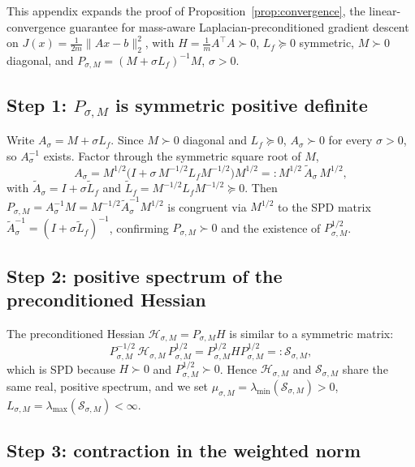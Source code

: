 \documentclass[12pt,a4paper]{article}
\theoremstyle{plain}
\theoremstyle{definition}
\theoremstyle{remark}
\newcommand{\1}{\mathbf{1}}
\begin{document}
This appendix expands the proof of Proposition~\ref{prop:convergence},
the linear-convergence guarantee for mass-aware
Laplacian-preconditioned gradient descent on
$J(x) = \frac{1}{2m}\|A x - b\|_2^2$, with
$H = \tfrac{1}{m} A^\top A \succ 0$, $L_f \succeq 0$ symmetric,
$M \succ 0$ diagonal, and
$P_{\sigma,M} = (M + \sigma L_f)^{-1} M$, $\sigma > 0$.

\subsection{Step 1: $P_{\sigma,M}$ is symmetric positive definite}

Write $A_\sigma = M + \sigma L_f$. Since $M \succ 0$ diagonal and
$L_f \succeq 0$, $A_\sigma \succ 0$ for every $\sigma > 0$, so
$A_\sigma^{-1}$ exists. Factor through the symmetric square root of $M$,
\[
    A_\sigma
    = M^{1/2}\bigl(I + \sigma\, M^{-1/2} L_f M^{-1/2}\bigr) M^{1/2}
    =: M^{1/2}\,\widetilde A_\sigma\, M^{1/2},
\]
with $\widetilde A_\sigma = I + \sigma \widetilde L_f$ and
$\widetilde L_f = M^{-1/2} L_f M^{-1/2} \succeq 0$. Then
$P_{\sigma,M} = A_\sigma^{-1} M = M^{-1/2} \widetilde A_\sigma^{-1} M^{1/2}$
is congruent via $M^{1/2}$ to the SPD matrix
$\widetilde A_\sigma^{-1} = (I + \sigma \widetilde L_f)^{-1}$, confirming
$P_{\sigma,M} \succ 0$ and the existence of $P_{\sigma,M}^{1/2}$.

\subsection{Step 2: positive spectrum of the preconditioned Hessian}

The preconditioned Hessian $\mathcal{H}_{\sigma,M} = P_{\sigma,M} H$ is
similar to a symmetric matrix:
\[
    P_{\sigma,M}^{-1/2}\,\mathcal{H}_{\sigma,M}\, P_{\sigma,M}^{1/2}
    = P_{\sigma,M}^{1/2} H P_{\sigma,M}^{1/2}
    =: \mathcal{S}_{\sigma,M},
\]
which is SPD because $H \succ 0$ and $P_{\sigma,M}^{1/2} \succ 0$. Hence
$\mathcal{H}_{\sigma,M}$ and $\mathcal{S}_{\sigma,M}$ share the same real,
positive spectrum, and we set
$\mu_{\sigma,M} = \lambda_{\min}(\mathcal{S}_{\sigma,M}) > 0$,
$L_{\sigma,M} = \lambda_{\max}(\mathcal{S}_{\sigma,M}) < \infty$.

\subsection{Step 3: contraction in the weighted norm}
\end{document}
